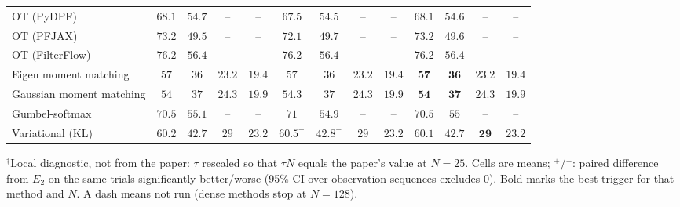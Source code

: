 \begin{table}[ht]
\begin{adjustbox}{max width=\linewidth}
\begin{tabular}{lcccc|cccc|cccc}
OT (PyDPF) & $68.1$ & $54.7$ & -- & -- & $\mathbf{67.5}$ & $\mathbf{54.5}$ & -- & -- & $68.1$ & $54.6$ & -- & -- \\
OT (PFJAX) & $73.2$ & $\mathbf{49.5}$ & -- & -- & $\mathbf{72.1}$ & $49.7$ & -- & -- & $73.2$ & $49.6$ & -- & -- \\
OT (FilterFlow) & $76.2$ & $56.4$ & -- & -- & $76.2$ & $\mathbf{56.4}$ & -- & -- & $\mathbf{76.2}$ & $56.4$ & -- & -- \\
Eigen moment matching & $57$ & $36$ & $\mathbf{23.2}$ & $19.4$ & $57$ & $36$ & $23.2$ & $\mathbf{19.4}$ & $\mathbf{57}$ & $\mathbf{36}$ & $23.2$ & $19.4$ \\
Gaussian moment matching & $54$ & $37$ & $\mathbf{24.3}$ & $\mathbf{19.9}$ & $54.3$ & $37$ & $24.3$ & $19.9$ & $\mathbf{54}$ & $\mathbf{37}$ & $24.3$ & $\mathbf{19.9}$ \\
Gumbel-softmax & $\mathbf{70.5}$ & $55.1$ & -- & -- & $71$ & $\mathbf{54.9}$ & -- & -- & $70.5$ & $55$ & -- & -- \\
Variational (KL) & $60.2$ & $42.7$ & $29$ & $23.2$ & $60.5^{-}$ & $42.8^{-}$ & $29$ & $23.2$ & $\mathbf{60.1}$ & $\mathbf{42.7}$ & $\mathbf{29}$ & $\mathbf{23.2}$ \\
\bottomrule
\end{tabular}
\end{adjustbox}
\par\smallskip\parbox{0.95\linewidth}{\footnotesize $^\dagger$Local diagnostic, not from the paper: $\tau$ rescaled so that $\tau N$ equals the paper's value at $N{=}25$. Cells are means; $^{+}$/$^{-}$: paired difference from $E_2$ on the same trials significantly better/worse (95\% CI over observation sequences excludes 0). Bold marks the best trigger for that method and $N$. A dash means not run (dense methods stop at $N{=}128$).}
\end{table}

